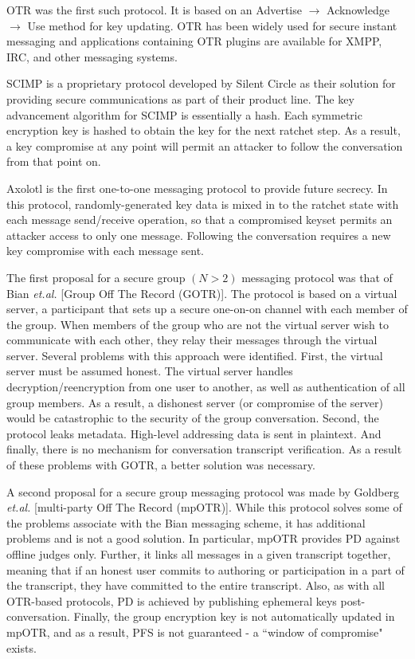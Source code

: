 \documentclass[%
preprint,
amsmath,amssymb,
aps,
prb,
floatfix,
]{revtex4-1}
\begin{document}
OTR was the first such protocol. It is based on an Advertise $\rightarrow$
Acknowledge $\rightarrow$ Use method for key updating. OTR has been widely used
for secure instant messaging and applications containing OTR plugins are
available for XMPP, IRC, and other messaging systems.

SCIMP is a proprietary protocol developed by Silent Circle as their solution for
providing secure communications as part of their product line. The key
advancement algorithm for SCIMP is essentially a hash. Each symmetric encryption
key is hashed to obtain the key for the next ratchet step. As a result, a key
compromise at any point will permit an attacker to follow the conversation from
that point on.

Axolotl is the first one-to-one messaging protocol to provide future secrecy. In
this protocol, randomly-generated key data is mixed in to the ratchet state with
each message send/receive operation, so that a compromised keyset permits an
attacker access to only one message. Following the conversation requires a new
key compromise with each message sent.

The first proposal for a secure group $(N > 2)$ messaging protocol was that of
Bian \textit{et.al.}\cite{ref:bian} [Group Off The Record (GOTR)].
The protocol is based on a virtual server,
a participant that sets up a secure one-on-on channel with each member of the group.
When members of the group who are not the virtual server wish to communicate
with each other, they relay their messages through the virtual server. Several
problems with this approach were identified. First, the virtual server must be
assumed honest. The virtual server handles decryption/reencryption from one user
to another, as well as authentication of all group members. As a result, a
dishonest server (or compromise of the server) would be catastrophic to the
security of the group conversation. Second, the protocol leaks metadata.
High-level addressing data is sent in plaintext. And finally, there is no mechanism for
conversation transcript verification. As a result of these problems with GOTR, a
better solution was necessary.

A second proposal for a secure group messaging protocol was made by Goldberg
\textit{et.al.}\cite{ref:goldberg} [multi-party Off The Record (mpOTR)].
While this protocol solves some of the
problems associate with the Bian messaging scheme, it has additional problems
and is not a good solution. In particular, mpOTR provides PD against offline
judges only. Further, it links all messages in a given transcript together,
meaning that if an honest user commits to authoring or participation in a part
of the transcript, they have committed to the entire transcript. Also, as with
all OTR-based protocols, PD is achieved by publishing ephemeral keys
post-conversation. Finally, the group encryption key is not automatically
updated in mpOTR, and as a result, PFS is not guaranteed - a ``window of
compromise" exists.
\end{document}
